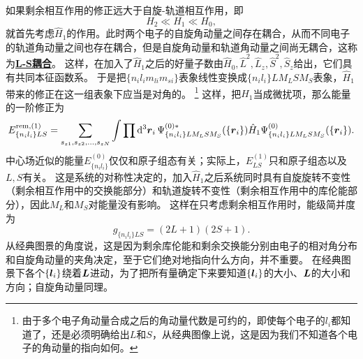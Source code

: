 \documentclass[UTF8, a4paper]{ctexart}
\newcommand*{\concept}[1]{\underline{\textbf{#1}}}
\begin{document}
如果剩余相互作用的修正远大于自旋-轨道相互作用，即
\begin{equation}
    H_2 \ll H_1 \ll H_0,
\end{equation}
就首先考虑$\hat{H}_1$的作用。此时两个电子的自旋角动量之间存在耦合，从而不同电子的轨道角动量之间也存在耦合，但是自旋角动量和轨道角动量之间尚无耦合，这称为\concept{L-S耦合}。
这样，在加入了$\hat{H}_1$之后的好量子数由$\hat{H}_0, \hat{L}^2, \hat{L}_z, \hat{S}^2, \hat{S}_z$给出，它们具有共同本征函数系。
于是把$\{n_i l_i m_{li} m_{si}\}$表象线性变换成$\{n_i l_i\} L M_L S M_S$表象，$\hat{H}_1$带来的修正在这一组表象下应当是对角的。%
\footnote{由于多个电子角动量合成之后的角动量代数是可约的，即使每个电子的$l_i$都知道了，还是必须明确给出$L$和$S$，从经典图像上说，这是因为我们不知道各个电子的角动量的指向如何。}%
这样，把$\hat{H}_1$当成微扰项，那么能量的一阶修正为
\begin{equation}
    E^{\text{rem}, (1)}_{\{n_i l_i\} LS} = \sum_{s_{z1}, s_{z2}, \ldots, s_{zN}} \int \prod \dd[3]{\vb*{r}_i} \Psi^{(0) *}_{\{n_i l_i\} L M_L S M_S}(\{\vb*{r}_i\}) \hat{H}_1 \Psi^{(0)}_{\{n_i l_i\} L M_L S M_S}(\{\vb*{r}_i\}).
    \label{eq:ls-1}
\end{equation}
中心场近似的能量$E^{(0)}_{\{n_i l_i\}}$仅仅和原子组态有关；实际上，$E^{(1)}_{LS}$只和原子组态以及$L,S$有关。
这是系统的对称性决定的，加入$\hat{H}_1$之后系统同时具有自旋旋转不变性（剩余相互作用中的交换能部分）和轨道旋转不变性（剩余相互作用中的库伦能部分），因此$M_L$和$M_S$对能量没有影响。
这样在只考虑剩余相互作用时，能级简并度为
\begin{equation}
    g_{\{n_i l_i\}LS} = (2L+1)(2S+1).
\end{equation}
从经典图景的角度说，这是因为剩余库伦能和剩余交换能分别由电子的相对角分布和自旋角动量的夹角决定，至于它们绝对地指向什么方向，并不重要。
在经典图景下各个$\{\vb*{l}_i\}$绕着$\vb*{L}$进动，为了把所有量确定下来要知道$\{\vb*{l}_i\}$的大小、$\vb*{L}$的大小和方向；自旋角动量同理。
\end{document}
